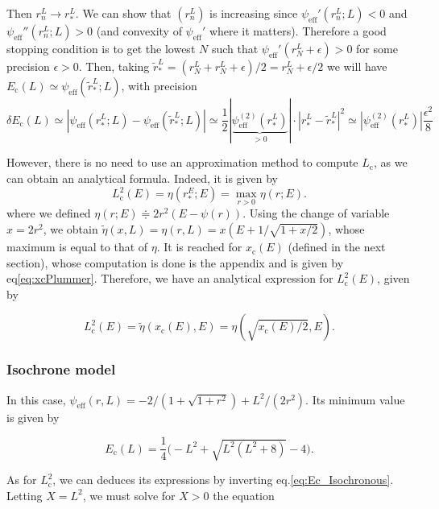 \documentclass[11pt]{article}
\newcommand{\rc}{\mathrm{c}}
\newcommand{\psieff}{\psi_{\mathrm{eff}}}
\newcommand{\Ec}{E_{{\mathrm{c}}}}
\newcommand{\Lc}{L_{{\mathrm{c}}}}
\newcommand{\xc}{x_{\rc}}
\begin{document}
Then $r_{n}^{L}\rightarrow r_{*}^{L}$. We can show that $(r_{n}^{L})$
is increasing since $\psieff'(r_{n}^{L};L)<0$ and $\psieff''(r_{n}^{L};L)>0$
(and convexity of $\psieff'$ where it matters). Therefore
a good stopping condition is to get the lowest $N$ such that $\psieff'(r_{N}^{L}+\epsilon)>0$
for some precision $\epsilon>0$. Then, taking $\tilde{r}_{*}^{L}=(r_{N}^{L}+r_{N}^{L}+\epsilon)/2=r_{N}^{L}+\epsilon/2$
we will have $\Ec(L)\simeq\psieff(\tilde{r}_{*}^{L};L)$,
with precision 
\begin{equation}
\delta \Ec(L)\simeq|\psieff(r_{*}^{L};L)-\psieff(\tilde{r}_{*}^{L};L)|\simeq\frac{1}{2}|\underbrace{\psieff^{(2)}(r_{*}^{L})}_{>0}|\cdot|r_{*}^{L}-\tilde{r}_{*}^{L}|^{2}\simeq|\psieff^{(2)}(r_{*}^{L})|\frac{\epsilon^{2}}{8}
\label{eq:precision_Ec}
\end{equation}

However, there is no need to use an approximation method to compute $\Lc$, as we can obtain an analytical formula. Indeed, it is given by
\begin{equation}
\Lc^{2}(E)=\eta(r_{*}^{E};E)=\max_{r>0}\eta(r;E).
\label{eq:angular_circular}
\end{equation}
where we defined $\eta(r;E)\doteqdot 2 r^{2}(E-\psi(r))$. Using the change of variable $x=2r^{2}$, we obtain $\tilde{\eta}(x,L)=\eta(r,L)=x(E+1/\sqrt{1+x/2})$, whose maximum is equal to that of $\eta$. It is reached for $\xc(E)$ (defined in the next section), whose computation is done is the appendix and is given by eq\eqref{eq:xcPlummer}. Therefore, we have an analytical expression for $\Lc^{2}(E)$, given by

\begin{equation}
  \Lc^{2}(E) =\tilde{\eta}(\xc(E),E) =\eta(\sqrt{\xc(E)/2},E) .
  \label{eq:Lc_analytical_Plummer}
  \end{equation}


\subsubsection{Isochrone model}
\label{subsubsec:IsoCircularOrbit}

In this case, $\psieff(r,L)=-2/(1+\sqrt{1+r^{2}}) + L^{2}/(2r^{2})$. Its minimum value is given by

\begin{equation}
  \Ec(L) = \frac{1}{4} \bigg(-L^{2} + \sqrt{L^{2}(L^{2}+8)}-4\bigg).
  \label{eq:Ec_Isochronous}
\end{equation}

As for $\Lc^{2}$, we can deduces its expressions by inverting eq.\eqref{eq:Ec_Isochronous}. Letting $X=L^{2}$, we must solve for $X>0$ the equation
\end{document}
